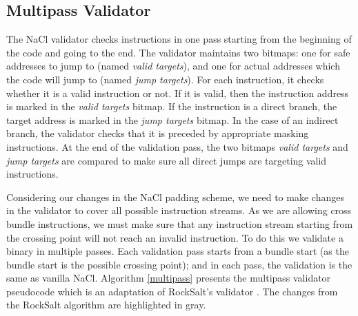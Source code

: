 \documentclass[conference]{IEEEtran}
\begin{document}




\subsection{Multipass Validator}
The NaCl validator checks instructions in one pass starting from the beginning of the code and going to  the end. The validator maintains two bitmaps: one for safe addresses to jump to (named \textit{valid targets}), and one for actual addresses which the code will jump to (named \textit{jump targets}). For each instruction, it checks whether it is a valid instruction or not. If it is valid, then  the instruction address is marked in the \textit{valid targets} bitmap. If the instruction is a direct branch, the target address is marked in the \textit{jump targets} bitmap. In the case of an indirect branch, the validator checks that  it is preceded by appropriate masking instructions. At the end of the validation pass, the two bitmaps \textit{valid targets} and \textit{jump targets} are compared  to make sure all direct jumps are targeting valid instructions. 

Considering our changes in the NaCl padding scheme, we need to make changes in the validator to cover all possible instruction streams. As we are allowing cross bundle instructions, we must make sure that any instruction stream starting from the crossing point will not reach an invalid instruction. To do this we validate a binary in multiple passes. Each validation pass starts from a bundle start (as the bundle start is the possible crossing point); and in each pass, the validation is the same as vanilla NaCl. Algorithm \ref{multipass} presents the multipass validator pseudocode which is an adaptation of RockSalt's validator \cite{morrisettRocksalt}.
%
The changes from the RockSalt algorithm are highlighted in gray.
\end{document}
